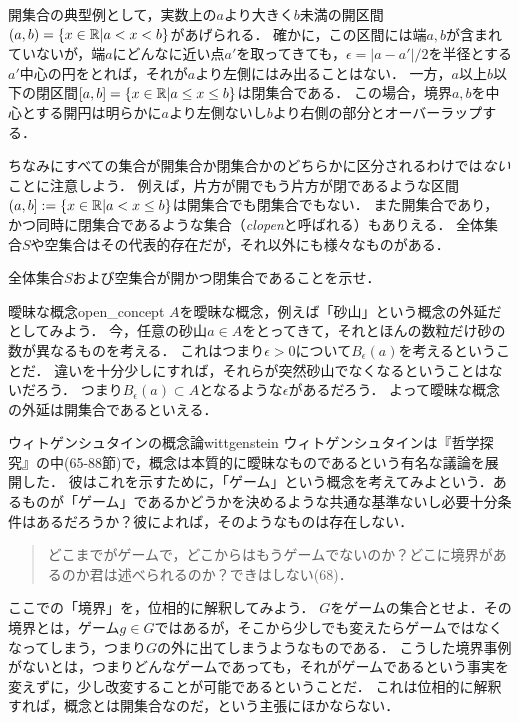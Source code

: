 \documentclass[11pt,a4paper, dvipdfmx]{jsarticle}
\begin{document}
開集合の典型例として，実数上の$a$より大きく$b$未満の開区間$(a, b) = \{x \in \mathbb{R}| a < x < b\}$があげられる．
確かに，この区間には端$a, b$が含まれていないが，端$a$にどんなに近い点$a'$を取ってきても，$\epsilon=|a-a'|/2$を半径とする$a'$中心の円をとれば，それが$a$より左側にはみ出ることはない．
一方，$a$以上$b$以下の閉区間$[a, b] = \{x \in \mathbb{R}| a \leq  x \leq  b\}$は閉集合である．
この場合，境界$a, b$を中心とする開円は明らかに$a$より左側ないし$b$より右側の部分とオーバーラップする．

ちなみにすべての集合が開集合か閉集合かのどちらかに区分されるわけでは\emph{ない}ことに注意しよう．
例えば，片方が開でもう片方が閉であるような区間$(a, b] := \{ x \in \mathbb{R}| a < x \leq b \}$は開集合でも閉集合でもない．
また開集合であり，かつ同時に閉集合であるような集合（\emph{clopen}と呼ばれる）もありえる．
全体集合$S$や空集合はその代表的存在だが，それ以外にも様々なものがある．

\begin{renshu}{}{}
  全体集合$S$および空集合が開かつ閉集合であることを示せ．
\end{renshu}


\begin{rei}{曖昧な概念}{open_concept}
  $A$を曖昧な概念，例えば「砂山」という概念の外延だとしてみよう．
  今，任意の砂山$a \in A$をとってきて，それとほんの数粒だけ砂の数が異なるものを考える．
  これはつまり$\epsilon > 0$について$B_\epsilon(a)$を考えるということだ．
  違いを十分少しにすれば，それらが突然砂山でなくなるということはないだろう．
  つまり$B_\epsilon(a) \subset A$となるような$\epsilon$があるだろう．
  よって曖昧な概念の外延は開集合であるといえる．
\end{rei}

\begin{rei}{ウィトゲンシュタインの概念論}{wittgenstein}
  ウィトゲンシュタインは『哲学探究』の中(65-88節)で，概念は本質的に曖昧なものであるという有名な議論を展開した．
  彼はこれを示すために，「ゲーム」という概念を考えてみよという．あるものが「ゲーム」であるかどうかを決めるような共通な基準ないし必要十分条件はあるだろうか？彼によれば，そのようなものは存在しない．
  \begin{quote}
    どこまでがゲームで，どこからはもうゲームでないのか？どこに境界があるのか君は述べられるのか？できはしない(68)．
  \end{quote}
  ここでの「境界」を，位相的に解釈してみよう．
  $G$をゲームの集合とせよ．その境界とは，ゲーム$g\in G$ではあるが，そこから少しでも変えたらゲームではなくなってしまう，つまり$G$の外に出てしまうようなものである．
  こうした境界事例がないとは，つまりどんなゲームであっても，それがゲームであるという事実を変えずに，少し改変することが可能であるということだ．
  これは位相的に解釈すれば，概念とは開集合なのだ，という主張にほかならない．
\end{rei}
\end{document}

